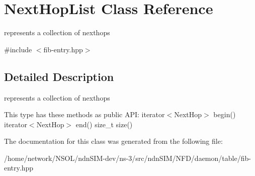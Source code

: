 \hypertarget{classNextHopList}{}\section{Next\+Hop\+List Class Reference}
\label{classNextHopList}


represents a collection of nexthops  




{\ttfamily \#include $<$fib-\/entry.\+hpp$>$}



\subsection{Detailed Description}
represents a collection of nexthops 

This type has these methods as public A\+PI\+: iterator$<$\+Next\+Hop$>$ begin() iterator$<$\+Next\+Hop$>$ end() size\+\_\+t size() 

The documentation for this class was generated from the following file\+:\begin{DoxyCompactItemize}
\item 
/home/network/\+N\+S\+O\+L/ndn\+S\+I\+M-\/dev/ns-\/3/src/ndn\+S\+I\+M/\+N\+F\+D/daemon/table/fib-\/entry.\+hpp\end{DoxyCompactItemize}
